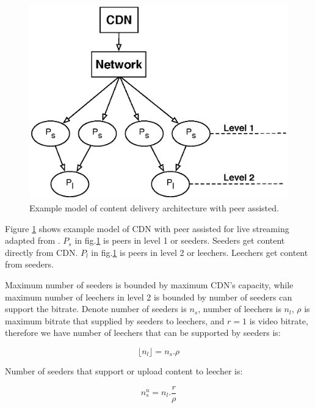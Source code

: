 \documentclass[conference]{IEEEtran}
\begin{document}
\begin{figure}[thb]
\begin{center}
\includegraphics[scale=0.6]{graphs/p2p-cdn.eps}
\end{center}
\caption{Example model of content delivery architecture with peer assisted.}
\label{fig:iptv}
\end{figure} 

Figure \ref{fig:iptv} shows example model of CDN with peer assisted for live streaming adapted from \cite{Yin:2010:LEC:1823746.1823750}.
$P_s$ in fig.\ref{fig:iptv} is peers in level 1 or seeders.  
Seeders get content directly from CDN.  
$P_l$ in fig.\ref{fig:iptv} is peers in level 2 or leechers.
Leechers get content from seeders.

Maximum number of seeders is bounded by maximum CDN's capacity, while maximum number of leechers in level 2 is bounded by number of seeders can support the bitrate.
Denote number of seeders is $n_s$, number of leechers is $n_l$, $\rho$ is maximum bitrate that supplied by seeders to leechers, and $r=1$ is video bitrate, therefore we have number of leechers that can be supported by seeders is:

\begin{equation}\label{eqn:leecher}
	\lfloor n_l \rfloor = n_s . \rho
\end{equation}

Number of seeders that support or upload content to leecher is:

\begin{equation}\label{eqn:seeders-to-leechers}
	n_{s}^{u} = n_l . \frac{r}{\rho}
\end{equation}
\end{document}
